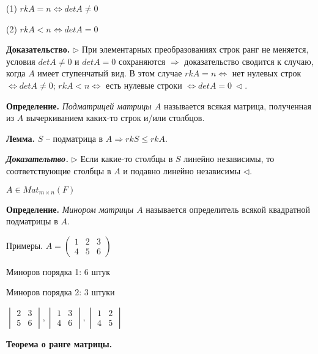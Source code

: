 (1) $rkA = n \Leftrightarrow detA \neq 0$

(2) $rkA < n \Leftrightarrow detA = 0$

\vspace{\baselineskip}
\textbf{Доказательство.} $\rhd$ При элементарных преобразованиях строк ранг не меняется, условия $detA \neq 0$ и $detA = 0$ сохраняются $\Rightarrow$ доказательство сводится к случаю, когда $A$ имеет ступенчатый вид. В этом случае $rkA = n \Leftrightarrow$ нет нулевых строк $\Leftrightarrow detA \neq 0$; $rkA < n \Leftrightarrow$ есть нулевые строки $\Leftrightarrow detA = 0 \ \lhd$.

\vspace{\baselineskip}
\textbf{Определение.} \textit{Подматрицей матрицы $A$} называется всякая матрица, полученная из $A$ вычеркиванием каких-то строк и/или столбцов.

\vspace{\baselineskip}
\textbf{Лемма.} $S$ -- подматрица в $A \Rightarrow rkS \leq rkA$.

\vspace{\baselineskip}
\textbf{\textit{Доказательтво.}} $\rhd$ Если какие-то столбцы в $S$ линейно независимы, то соответствующие столбцы в $A$ и подавно линейно независимы $\lhd$.

\vspace{\baselineskip}
$A \in Mat_{m \times n} (F)$

\textbf{Определение.} \textit{Минором матрицы $A$} называется определитель всякой квадратной подматрицы в $A$.

\vspace{\baselineskip}
Примеры. $A = \begin{pmatrix} 1 & 2 & 3 \\ 4 & 5 & 6 \end{pmatrix}$

Миноров порядка 1: 6 штук

Миноров порядка 2: 3 штуки

$\begin{vmatrix} 2 & 3 \\ 5 & 6 \end{vmatrix}, \begin{vmatrix} 1 & 3 \\ 4 & 6 \end{vmatrix}, \begin{vmatrix} 1 & 2 \\ 4 & 5 \end{vmatrix}$

\vspace{\baselineskip}
\textbf{Теорема о ранге матрицы.} 

